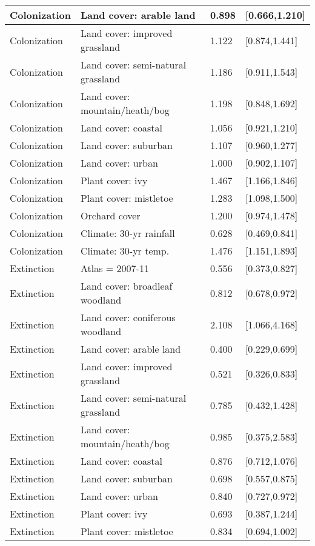 \documentclass[a4paper, nobind]{templates/ociamthesis}
\begin{document}
\begin{longtable}{l|l|l|l}
\hline
Colonization & Land cover: arable land & 0.898 & [0.666,1.210]\\
\hline
Colonization & Land cover: improved grassland & 1.122 & [0.874,1.441]\\
\hline
Colonization & Land cover: semi-natural grassland & 1.186 & [0.911,1.543]\\
\hline
Colonization & Land cover: mountain/heath/bog & 1.198 & [0.848,1.692]\\
\hline
Colonization & Land cover: coastal & 1.056 & [0.921,1.210]\\
\hline
Colonization & Land cover: suburban & 1.107 & [0.960,1.277]\\
\hline
Colonization & Land cover: urban & 1.000 & [0.902,1.107]\\
\hline
Colonization & Plant cover: ivy & 1.467 & [1.166,1.846]\\
\hline
Colonization & Plant cover: mistletoe & 1.283 & [1.098,1.500]\\
\hline
Colonization & Orchard cover & 1.200 & [0.974,1.478]\\
\hline
Colonization & Climate: 30-yr rainfall & 0.628 & [0.469,0.841]\\
\hline
Colonization & Climate: 30-yr temp. & 1.476 & [1.151,1.893]\\
\hline
Extinction & Atlas = 2007-11 & 0.556 & [0.373,0.827]\\
\hline
Extinction & Land cover: broadleaf woodland & 0.812 & [0.678,0.972]\\
\hline
Extinction & Land cover: coniferous woodland & 2.108 & [1.066,4.168]\\
\hline
Extinction & Land cover: arable land & 0.400 & [0.229,0.699]\\
\hline
Extinction & Land cover: improved grassland & 0.521 & [0.326,0.833]\\
\hline
Extinction & Land cover: semi-natural grassland & 0.785 & [0.432,1.428]\\
\hline
Extinction & Land cover: mountain/heath/bog & 0.985 & [0.375,2.583]\\
\hline
Extinction & Land cover: coastal & 0.876 & [0.712,1.076]\\
\hline
Extinction & Land cover: suburban & 0.698 & [0.557,0.875]\\
\hline
Extinction & Land cover: urban & 0.840 & [0.727,0.972]\\
\hline
Extinction & Plant cover: ivy & 0.693 & [0.387,1.244]\\
\hline
Extinction & Plant cover: mistletoe & 0.834 & [0.694,1.002]\\

\end{longtable}
\end{document}
